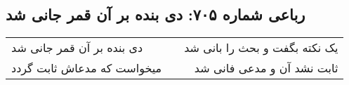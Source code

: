 \begin{center}
\section*{رباعی شماره ۷۰۵: دی بنده بر آن قمر جانی شد}
\label{sec:0705}
\begin{longtable}{l p{0.5cm} r}
دی بنده بر آن قمر جانی شد
&&
یک نکته بگفت و بحث را بانی شد
\\
میخواست که مدعاش ثابت گردد
&&
ثابت نشد آن و مدعی فانی شد
\\
\end{longtable}
\end{center}
